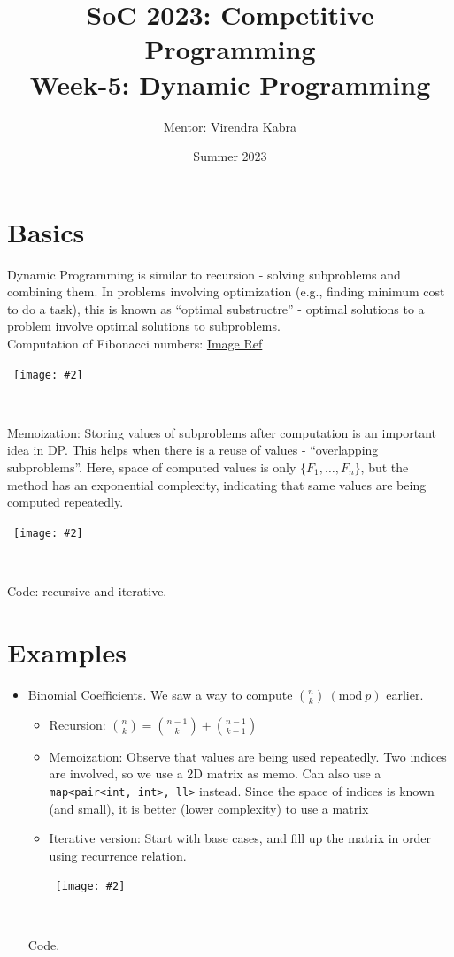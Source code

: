 \documentclass{article}
\title{\textbf{SoC 2023: Competitive Programming \\ {\Large Week-5: Dynamic Programming}}}
\author{Mentor: Virendra Kabra}
\date{Summer 2023}
\newcommand{\T}[1]{\texttt{#1}}
\newcommand{\Mod}[1]{\ (\mathrm{mod}\ #1)}
\newcommand{\image}[2]{\
    \begin{center}\
        \texttt{[image: \#2]}\
    \end{center}\
}
\begin{document}
\begin{sloppypar}       %

    \maketitle
    \tableofcontents
    \thispagestyle{empty}

    \newpage

    \section{Basics}
    Dynamic Programming is similar to recursion - solving subproblems and combining them. In problems involving optimization (e.g., finding minimum cost to do a task), this is known as ``optimal substructre'' - optimal solutions to a problem involve optimal solutions to subproblems.
    \\
    \noindent Computation of Fibonacci numbers: \href{http://courses.csail.mit.edu/6.006/fall09/lecture_notes/lecture18.pdf}{Image Ref}
    \image{0.8}{../images/fib-1.png}

    \noindent Memoization: Storing values of subproblems after computation is an important idea in DP. This helps when there is a reuse of values - ``overlapping subproblems''. Here, space of computed values is only $\{F_1, \dots, F_n\}$, but the method has an exponential complexity, indicating that same values are being computed repeatedly.
    \image{0.8}{../images/fib-2.png}

    Code: recursive and iterative.

    \newpage

    \section{Examples}

    \begin{itemize}
        \item Binomial Coefficients. We saw a way to compute ${n \choose k} \Mod{p}$ earlier.
        \begin{itemize}
            \item Recursion: ${n \choose k} = {n-1 \choose k} + {n-1 \choose k-1}$
            \item Memoization: Observe that values are being used repeatedly. Two indices are involved, so we use a 2D matrix as memo. Can also use a \T{map<pair<int, int>, ll>} instead. Since the space of indices is known (and small), it is better (lower complexity) to use a matrix
            \item Iterative version: Start with base cases, and fill up the matrix in order using recurrence relation.
            \image{0.7}{../images/bin-coeff.png}
        \end{itemize}
        Code.


\end{itemize}
\end{sloppypar}
\end{document}
